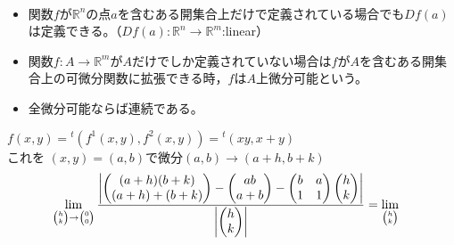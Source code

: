 \begin{note}\
	\begin{itemize}
		\item 関数$f$が$\mathbb{R}^n$の点$a$を含むある開集合上だけで定義されている場合でも$Df(a)$は定義できる。（$Df(a):\mathbb{R}^n\to\mathbb{R}^m$:linear）
		\item 関数$f:A\to\mathbb{R}^m$が$A$だけでしか定義されていない場合は$f$が$A$を含むある開集合上の可微分関数に拡張できる時，$f$は$A$上微分可能という。
		\item 全微分可能ならば連続である。
	\end{itemize}
\end{note}

\begin{example}
$f(x,y)={}^{t}(f^1(x,y),f^2(x,y))={}^{t}(xy,x+y)$\\
これを	$(x,y)=(a,b)$で微分$(a,b)\to(a+h,b+k)$
\[
\begin{split}
\lim_{
\tiny
\begin{pmatrix}
h \\
k \\
\end{pmatrix}
\to
\begin{pmatrix}
0 \\
0 \\
\end{pmatrix}}
\frac{
\left|
\begin{pmatrix}
(a+h)(b+k) \\
(a+h)+(b+k) \\
\end{pmatrix}
-
\begin{pmatrix}
ab \\
a+b \\
\end{pmatrix}
-
\begin{pmatrix}
b & a \\
1 & 1\\
\end{pmatrix}
\begin{pmatrix}
h \\
k \\
\end{pmatrix}
\right|
}
{\left|\begin{pmatrix}
h \\
k \\
\end{pmatrix}\right|}
&=
\lim_{
\tiny
\begin{pmatrix}
h \\
k \\

\end{pmatrix}}
\end{split}\]
\end{example}
